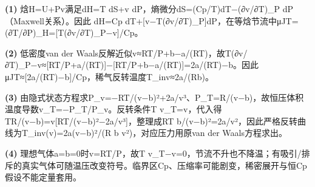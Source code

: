 \par\noindent\textbf{(1)} 焓H=U+Pv满足dH=T dS+v dP，熵微分dS=(Cp/T)dT−(∂v/∂T)\_P dP（Maxwell关系）。因此 dH=Cp dT+[v−T(∂v/∂T)\_P]dP，在等焓节流中μJT=(∂T/∂P)\_H=[T(∂v/∂T)\_P−v]/Cp。
\par\noindent\textbf{(2)} 低密度van der Waals反解近似v≈RT/P+b−a/(RT)，故T(∂v/∂T)\_P−v≈[RT/P+a/(RT)]−[RT/P+b−a/(RT)]=2a/(RT)−b。因此μJT≈[2a/(RT)−b]/Cp，稀气反转温度T\_inv≈2a/(Rb)。
\par\noindent\textbf{(3)} 由隐式状态方程求P\_v=−RT/(v−b)²+2a/v³、P\_T=R/(v−b)，故恒压体积温度导数v\_T=−P\_T/P\_v。反转条件T v\_T=v，代入得TR/(v−b)=v[RT/(v−b)²−2a/v³]，整理成RT b/(v−b)²=2a/v²，因此严格反转曲线为T\_inv(v)=2a(v−b)²/(R b v²)，对应压力用原van der Waals方程求出。
\par\noindent\textbf{(4)} 理想气体a=b=0时v=RT/P，故T v\_T−v=0，节流不升也不降温；有吸引/排斥的真实气体可随温压改变符号。临界区Cp、压缩率可能剧变，稀密展开与恒Cp假设不能定量套用。
